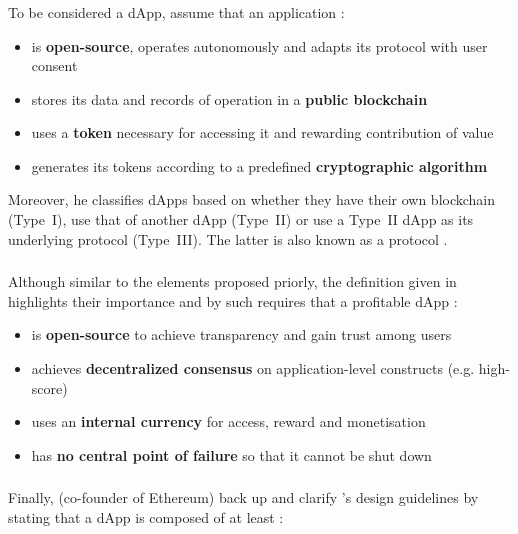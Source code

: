 \subsubsection{\citeyear{Johnston2015}}
To be considered a \ac{dApp}, \citeauthor{Johnston2015} assume that an application \cite[p.~2]{Johnston2015}:

\begin{itemize}
  \item is \textbf{open-source}, operates autonomously and adapts its protocol with user consent 
  \item stores its data and records of operation in a \textbf{public blockchain}
  \item uses a \textbf{token} necessary for accessing it and rewarding contribution of value
  \item generates its tokens according to a predefined \textbf{cryptographic algorithm}
\end{itemize}

Moreover, he classifies \acp{dApp} based on whether they have their own blockchain (Type~I), use that of another \ac{dApp} (Type~II) or use a Type~II \ac{dApp} as its underlying protocol (Type~III). The latter is also known as a protocol \cite[pp.~3-4]{Johnston2015}.

\subsubsection{\citeyear{Raval.2016}}
Although similar to the elements proposed priorly, the definition given in  highlights their importance and by such requires that a profitable \ac{dApp} \cite[pp.~9-14]{Raval.2016}:
 
 \begin{itemize}
  \item is \textbf{open-source} to achieve transparency and gain trust among users 
  \item achieves \textbf{decentralized consensus} on application-level constructs (e.g. high-score)
  \item uses an \textbf{internal currency} for access, reward and monetisation
  \item has \textbf{no central point of failure} so that it cannot be shut down
\end{itemize}

\subsubsection{\citeyear{Antonopoulos.2018}}
Finally, \citeauthor{Antonopoulos.2018} (co-founder of Ethereum) back up and clarify \citeauthor{EthereumWhitepaper}'s design guidelines by stating that a \ac{dApp} is composed of at least \cite[p.~34]{Antonopoulos.2018}:

